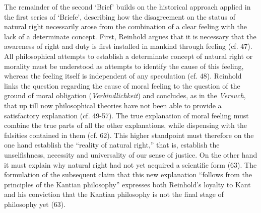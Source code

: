  The remainder of the second `Brief' builds on the historical approach applied in the first series of `Briefe', describing how the disagreement on the status of natural right necessarily arose from the combination of a clear feeling with the lack of a determinate concept. First, Reinhold argues that it is necessary that the awareness of right and duty is first installed in mankind through feeling (cf. 47). All philosophical attempts to establish a determinate concept of natural right or morality must be understood as attempts to identify the cause of this feeling, whereas the feeling itself is independent of any speculation (cf. 48). Reinhold links the question regarding the cause of moral feeling to the question of the ground of moral obligation (\textit{Verbindlichkeit}) and concludes, as in the \textit{Versuch}, that up till now philosophical theories have not been able to provide a satisfactory explanation (cf. 49{-}57). The true explanation of moral feeling must combine the true parts of all the other explanations, while dispensing with the falsities contained in them (cf. 62). This higher standpoint must therefore on the one hand establish the ``reality of natural right,'' that is, establish the unselfishness, necessity and universality of our sense of justice. On the other hand it must explain why natural right had not yet acquired a scientific form (63). The formulation of the subsequent claim that this new explanation ``follows from the principles of the Kantian philosophy'' expresses both Reinhold's loyalty to Kant and his conviction that the Kantian philosophy is not the final stage of philosophy yet (63). 

